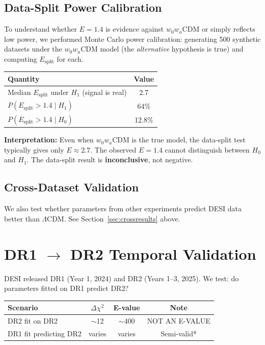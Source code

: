 \documentclass[11pt,a4paper]{article}
\newcommand{\LCDM}{$\Lambda$CDM}
\begin{document}
\subsection{Data-Split Power Calibration}

To understand whether $E = 1.4$ is evidence against $w_0w_a$CDM or simply reflects low power, we performed Monte Carlo power calibration: generating 500 synthetic datasets under the $w_0w_a$CDM model (the \textit{alternative} hypothesis is true) and computing $E_{\text{split}}$ for each.

\begin{center}
\begin{tabular}{lc}
\toprule
\textbf{Quantity} & \textbf{Value} \\
\midrule
Median $E_{\text{split}}$ under $H_1$ (signal is real) & 2.7 \\
$P(E_{\text{split}} > 1.4 \mid H_1)$ & 64\% \\
$P(E_{\text{split}} > 1.4 \mid H_0)$ & 12.8\% \\
\bottomrule
\end{tabular}
\end{center}

\textbf{Interpretation:} Even when $w_0w_a$CDM is the true model, the data-split test typically gives only $E \approx 2.7$. The observed $E = 1.4$ cannot distinguish between $H_0$ and $H_1$. The data-split result is \textbf{inconclusive}, not negative.


\subsection{Cross-Dataset Validation}

We also test whether parameters from other experiments predict DESI data better than \LCDM. See Section~\ref{sec:crossresults} above.


\section{DR1 $\to$ DR2 Temporal Validation}
\label{sec:temporal}

DESI released DR1 (Year 1, 2024) and DR2 (Years 1--3, 2025). We test: do parameters fitted on DR1 predict DR2?

\begin{center}
\begin{tabular}{lccc}
\toprule
\textbf{Scenario} & $\Delta\chi^2$ & \textbf{E-value} & \textbf{Note} \\
\midrule
DR2 fit on DR2 & $\sim$12 & $\sim$400 & NOT AN E-VALUE \\
DR1 fit predicting DR2 & varies & varies & Semi-valid* \\
\bottomrule
\end{tabular}
\end{center}
\end{document}
